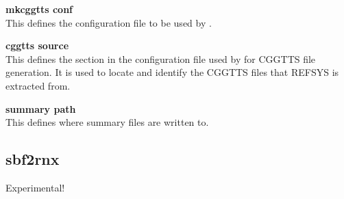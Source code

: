 {\bfseries mkcggtts conf}\\
This defines the configuration file to be used by .

{\bfseries cggtts source}\\
This defines the section in the configuration file used by  for CGGTTS file generation.
It is used to locate and identify the CGGTTS files that REFSYS is extracted from.

{\bfseries summary path }\\
This defines where summary files are written to.

\subsection{sbf2rnx}
Experimental!
